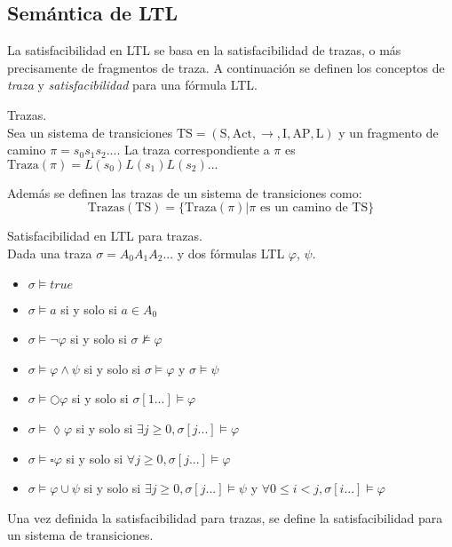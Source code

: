 \subsection{Semántica de LTL}
La satisfacibilidad en LTL se basa en la satisfacibilidad de trazas, o más precisamente de fragmentos
de traza.
A continuación se definen los conceptos de \textit{traza} y \textit{satisfacibilidad} para
 una fórmula LTL.

\begin{definicion}
Trazas.\\
Sea un sistema de transiciones
 $\text{TS} = (\text{S}, \text{Act}, {\to}, \text{I}, \text{AP}, \text{L})$ y un fragmento de
 camino $\pi = s_0 s_1 s_2 ...$. La traza correspondiente a $\pi$ es
 $\text{Traza}(\pi) = L(s_0) L(s_1) L(s_2) ...$

Además se definen las trazas de un sistema de transiciones como:
\[ \text{Trazas}(\text{TS}) = \{ \text{Traza}(\pi) | \pi \text{ es un camino de TS} \} \]
\end{definicion}


\begin{definicion}
Satisfacibilidad en LTL para trazas.\\
Dada una traza $\sigma = A_0 A_1 A_2 ...$ y dos fórmulas LTL $\varphi$, $\psi$.
\begin{itemize}
\item $\sigma \models \textit{true}$
\item $\sigma \models a$ si y solo si $a \in A_0$
\item $\sigma \models \neg \varphi $ si y solo si $\sigma \not\models \varphi $
\item $\sigma \models \varphi \wedge \psi $ si y solo si $\sigma \models \varphi $ y $\sigma \models \psi $
\item $\sigma \models \bigcirc \varphi $ si y solo si $\sigma [1...] \models \varphi$
\item $\sigma \models \lozenge \varphi $ si y solo si $\exists j \ge 0, \sigma [j...] \models \varphi$
\item $\sigma \models \square \varphi $ si y solo si $\forall j \ge 0, \sigma [j...] \models \varphi$
\item $\sigma \models \varphi \cup \psi $ si y solo si $\exists j \ge 0, \sigma [j...] \models \psi $ y $\forall 0 \le i < j, \sigma [i...] \models \varphi $
\end{itemize}
\end{definicion}

Una vez definida la satisfacibilidad para trazas, se define la satisfacibilidad
 para un sistema de transiciones.
 
